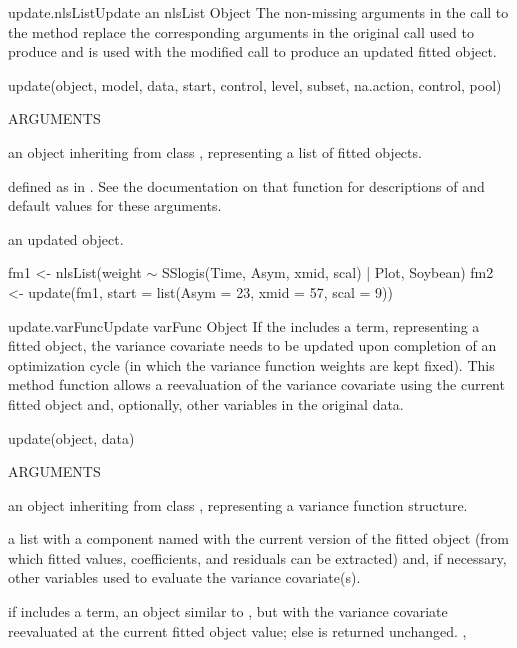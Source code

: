 \documentclass[pdftex]{article} \usepackage{url,graphicx}
\renewcommand{\Twiddle}{\mbox{\(\sim\)}}
\begin{document}
\begin{Helpfile}{update.nlsList}{Update an nlsList Object}
The non-missing arguments in the call to the  method
replace the corresponding arguments in the original call used to
produce  and  is used with the modified call to
produce an updated fitted object.
\begin{Example}
update(object, model, data, start, control, level, subset, 
       na.action, control, pool)
\end{Example}
\begin{Argument}{ARGUMENTS}
\item[\Co{object:}]
an object inheriting from class , representing
a list of fitted  objects.
\item[\Co{other arguments:}]
defined as in . See the
documentation on that function for descriptions of and default values
for these arguments.
\end{Argument}
an updated  object.
\need 15pt
\vspace{-16pt}
\begin{Example}
fm1 <- nlsList(weight {\Twiddle} SSlogis(Time, Asym, xmid, scal) | Plot, 
               Soybean)
fm2 <- update(fm1, start = list(Asym = 23, xmid = 57, scal = 9))
\end{Example}
\end{Helpfile}
\begin{Helpfile}{update.varFunc}{Update varFunc Object}
If the  includes a  term, representing
a fitted object, the variance covariate needs to be updated upon
completion of an optimization cycle (in which the variance function
weights are kept fixed). This method function allows a reevaluation of
the variance covariate using the current fitted object and,
optionally, other variables in the original data.
\begin{Example}
update(object, data)
\end{Example}
\begin{Argument}{ARGUMENTS}
\item[\Co{object:}]
an object inheriting from class ,
representing a variance function structure.
\item[\Co{data:}]
a list with a component named  with the current
version of the fitted object (from which fitted values, coefficients,
and residuals can be extracted) and, if necessary, other variables
used to evaluate the variance covariate(s).
\end{Argument}
if  includes a  term, an
 object similar to , but with the 
variance covariate reevaluated at the current fitted object value;
else  is returned unchanged.
, 
\end{Helpfile}
\end{document}
